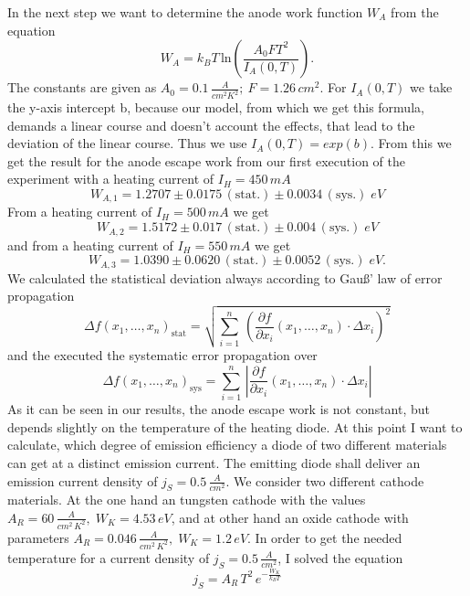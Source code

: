 \documentclass[a4paper, 12pt]{scrartcl}
\begin{document}
\newpage
In the next step we want to determine the anode work function $W_A$ from the equation 
\begin{equation*}W_A=k_BT\,\text{ln}\left(\frac{A_0FT^2}{I_A(0,T)}\right).\end{equation*}
The constants are given as $A_0=0.1\,\frac{A}{cm^2K^2};\:F=1.26\,cm^2$.
For $I_A(0,T)$ we take the y-axis intercept b, because our model, from which we get this formula, demands a linear course and doesn't account the effects, that lead to the deviation of the linear course. Thus we use $I_A(0,T)=exp(b)$.\newline
From this we get the result for the anode escape work from our first execution of the experiment with a heating current of $I_H=450\,mA$
$$W_{A,1}=1.2707\pm0.0175\,(\text{stat.})\pm0.0034\,(\text{sys.})\;eV$$
From a heating current of $I_H=500\,mA$ we get
$$W_{A,2}=1.5172\pm0.017\,(\text{stat.})\pm0.004\,(\text{sys.})\;eV$$
and from a heating current of $I_H=550\,mA$ we get
$$W_{A,3}=1.0390\pm0.0620\,(\text{stat.})\pm0.0052\,(\text{sys.})\;eV.$$
We calculated the statistical deviation always according to Gauß' law of error propagation
\begin{equation*}\Delta{f}\left(x_1,\dots,x_n\right)_\text{stat}=\sqrt{\sum_{i=1}^n\,\left(\frac{\partial{f}}{\partial{x_i}}\left(x_1,\dots,x_n\right)\cdot\Delta{x_i}\right)^2}\end{equation*}
and the executed the systematic error propagation over
\begin{equation*}\Delta{f}\left(x_1,\dots,x_n\right)_\text{sys}=\sum_{i=1}^n\,\left\vert\frac{\partial{f}}{\partial{x_i}}\left(x_1,\dots,x_n\right)\cdot\Delta{x_i}\right\vert\end{equation*}
As it can be seen in our results, the anode escape work is not constant, but depends slightly on the temperature of the heating diode.\newline\newline
\newpage
At this point I want to calculate, which degree of emission efficiency a diode of two different materials can get at a distinct emission current. The emitting diode shall deliver an emission current density of $j_S=0.5\,\frac{A}{cm^2}$. We consider two different cathode materials. 
At the one hand an tungsten cathode with the values $A_R=60\,\frac{A}{cm^2\,K^2},\;W_K=4.53\,eV$, and at other hand an oxide cathode with parameters $A_R=0.046\,\frac{A}{cm^2\,K^2},\;W_K=1.2\,eV$. In order to get the needed temperature for a current density of $j_S=0.5\,\frac{A}{cm^2}$, I solved the equation
\begin{equation*}j_S=A_R\,T^2\,e^{-\frac{W_K}{k_BT}}\end{equation*}
\end{document}
